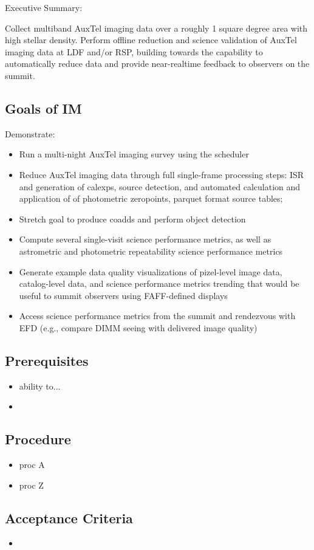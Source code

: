 
Executive Summary:

Collect multiband AuxTel imaging data over a roughly 1 square degree area with high stellar density.
Perform offline reduction and science validation of AuxTel imaging data at LDF and/or RSP, building towards the capability to automatically reduce data and provide near-realtime feedback to observers on the summit.

\subsection{Goals of IM}
Demonstrate:
\begin{itemize}
\item Run a multi-night AuxTel imaging survey using the scheduler
\item Reduce AuxTel imaging data through full single-frame processing steps: ISR and generation of calexps, source detection, and automated calculation and application of of photometric zeropoints, parquet format source tables;
\item Stretch goal to produce coadds and perform object detection
\item Compute several single-visit science performance metrics, as well as astrometric and photometric repeatability science performance metrics
\item Generate example data quality visualizations of pizel-level image data, catalog-level data, and science performance metrics trending that would be useful to summit observers using FAFF-defined displays
\item Access science performance metrics from the summit and rendezvous with EFD (e.g., compare DIMM seeing with delivered image quality)
\end{itemize}

\subsection{Prerequisites}
\begin{itemize}
\item ability to...
\item {}
\end{itemize}

\subsection{Procedure}
\begin{itemize}
\item proc A
\item proc Z
\end{itemize}

\subsection{Acceptance Criteria}
\begin{itemize}
\item
\end{itemize}
